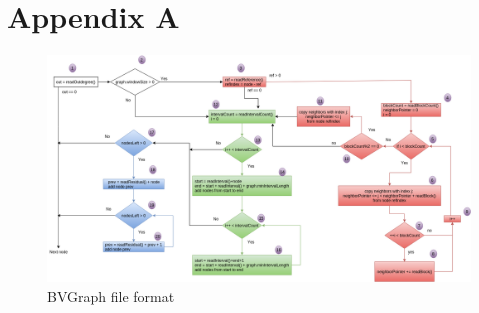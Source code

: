 \chapter{Appendix A}

\begin{figure}[ht]
    \centering
    \includegraphics[scale=.44, angle=90]{figure/BVGraph_format}
    \caption{BVGraph file format}
    \label{fig:BVGraphFormat}
\end{figure}

\newgeometry{}